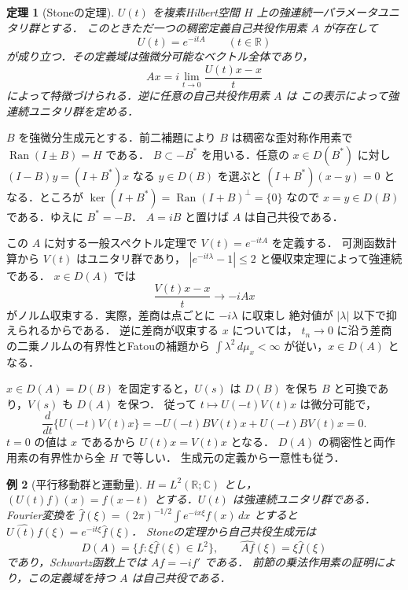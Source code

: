 \documentclass[a5paper,10pt,onecolumn]{jsarticle}
\makeatletter
\theoremstyle{mathnotetheorem}
\newtheorem{theorem}{定理}[section]
\newtheorem{example}[theorem]{例}
\renewcommand{\proofname}{証明}
\renewenvironment{proof}[1][\proofname]{%
  \par\pushQED{\qed}\normalfont\topsep4\p@\@plus2\p@\relax
  \trivlist\item[\hskip\labelsep\bfseries #1]\ignorespaces
}{\popQED\endtrivlist\@endpefalse}
\makeatother
\begin{document}
\begin{theorem}[Stoneの定理]
$U(t)$ を複素Hilbert空間 $H$ 上の強連続一パラメータユニタリ群とする．
このときただ一つの稠密定義自己共役作用素 $A$ が存在して
\[
 U(t)=e^{-itA}\qquad(t\in\mathbb R)
\]
が成り立つ．その定義域は強微分可能なベクトル全体であり，
\[
 Ax=i\lim_{t\to0}\frac{U(t)x-x}{t}
\]
によって特徴づけられる．逆に任意の自己共役作用素 $A$ は
この表示によって強連続ユニタリ群を定める．
\end{theorem}
\begin{proof}
$B$ を強微分生成元とする．前二補題により $B$ は稠密な歪対称作用素で
$\operatorname{Ran}(I\pm B)=H$ である．
$B\subset-B^*$ を用いる．任意の $x\in D(B^*)$ に対し
$(I-B)y=(I+B^*)x$ なる $y\in D(B)$ を選ぶと
$(I+B^*)(x-y)=0$ となる．ところが
$\ker(I+B^*)=\operatorname{Ran}(I+B)^\perp=\{0\}$ なので
$x=y\in D(B)$ である．ゆえに $B^*=-B$．
$A=iB$ と置けば $A$ は自己共役である．

この $A$ に対する一般スペクトル定理で
$V(t)=e^{-itA}$ を定義する．
可測函数計算から $V(t)$ はユニタリ群であり，
$|e^{-it\lambda}-1|\le2$ と優収束定理によって強連続である．
$x\in D(A)$ では
\[
 \frac{V(t)x-x}{t}\longrightarrow-iAx
\]
がノルム収束する．実際，差商は点ごとに $-i\lambda$ に収束し
絶対値が $|\lambda|$ 以下で抑えられるからである．
逆に差商が収束する $x$ については，
$t_n\to0$ に沿う差商の二乗ノルムの有界性とFatouの補題から
$\int\lambda^2\,d\mu_x<\infty$ が従い，$x\in D(A)$ となる．

$x\in D(A)=D(B)$ を固定すると，$U(s)$ は $D(B)$ を保ち
$B$ と可換であり，$V(s)$ も $D(A)$ を保つ．
従って $t\mapsto U(-t)V(t)x$ は微分可能で，
\[
 \frac d{dt}\{U(-t)V(t)x\}
  =-U(-t)BV(t)x+U(-t)BV(t)x=0.
\]
$t=0$ の値は $x$ であるから $U(t)x=V(t)x$ となる．
$D(A)$ の稠密性と両作用素の有界性から全 $H$ で等しい．
生成元の定義から一意性も従う．
\end{proof}

\begin{example}[平行移動群と運動量]
$H=L^2(\mathbb R;\mathbb C)$ とし，
$(U(t)f)(x)=f(x-t)$ とする．$U(t)$ は強連続ユニタリ群である．
Fourier変換を $\widehat f(\xi)=(2\pi)^{-1/2}
\int e^{-ix\xi}f(x)\,dx$ とすると
$\widehat{U(t)f}(\xi)=e^{-it\xi}\widehat f(\xi)$．
Stoneの定理から自己共役生成元は
\[
 D(A)=\{f:\xi\widehat f(\xi)\in L^2\},\qquad
 \widehat{Af}(\xi)=\xi\widehat f(\xi)
\]
であり，Schwartz函数上では $Af=-if'$ である．
前節の乗法作用素の証明により，この定義域を持つ $A$ は自己共役である．
\end{example}
\end{document}
